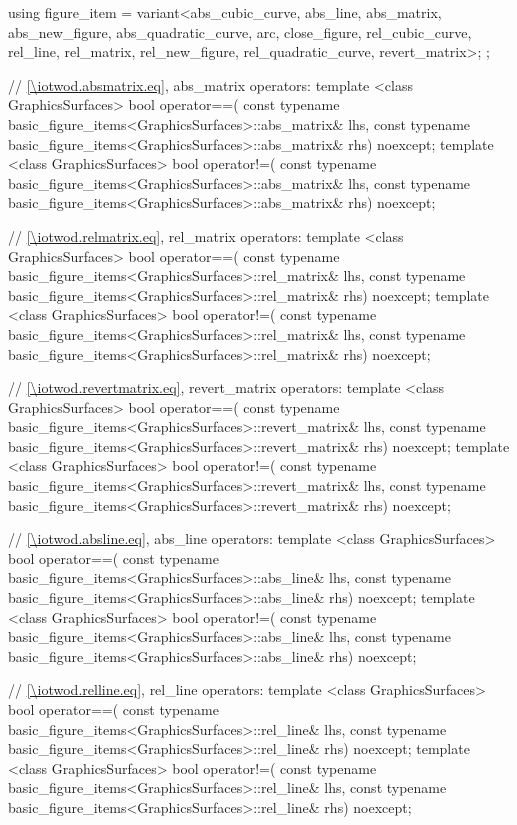\begin{codeblock}
{{    using figure_item = variant<abs_cubic_curve, abs_line, abs_matrix, abs_new_figure,
      abs_quadratic_curve, arc, close_figure, rel_cubic_curve, rel_line, rel_matrix,
      rel_new_figure, rel_quadratic_curve, revert_matrix>;
  };

  // \ref{\iotwod.absmatrix.eq}, abs_matrix operators:
  template <class GraphicsSurfaces>
  bool operator==(
    const typename basic_figure_items<GraphicsSurfaces>::abs_matrix& lhs,
    const typename basic_figure_items<GraphicsSurfaces>::abs_matrix& rhs) 
    noexcept;
  template <class GraphicsSurfaces>
  bool operator!=(
    const typename basic_figure_items<GraphicsSurfaces>::abs_matrix& lhs,
    const typename basic_figure_items<GraphicsSurfaces>::abs_matrix& rhs) 
    noexcept;

  // \ref{\iotwod.relmatrix.eq}, rel_matrix operators:
  template <class GraphicsSurfaces>
  bool operator==(
    const typename basic_figure_items<GraphicsSurfaces>::rel_matrix& lhs,
    const typename basic_figure_items<GraphicsSurfaces>::rel_matrix& rhs) 
    noexcept;
  template <class GraphicsSurfaces>
  bool operator!=(
    const typename basic_figure_items<GraphicsSurfaces>::rel_matrix& lhs,
    const typename basic_figure_items<GraphicsSurfaces>::rel_matrix& rhs) 
    noexcept;

  // \ref{\iotwod.revertmatrix.eq}, revert_matrix operators:
  template <class GraphicsSurfaces>
  bool operator==(
    const typename basic_figure_items<GraphicsSurfaces>::revert_matrix& lhs,
    const typename basic_figure_items<GraphicsSurfaces>::revert_matrix& rhs) 
    noexcept;
  template <class GraphicsSurfaces>
  bool operator!=(
    const typename basic_figure_items<GraphicsSurfaces>::revert_matrix& lhs,
    const typename basic_figure_items<GraphicsSurfaces>::revert_matrix& rhs) 
    noexcept;

  // \ref{\iotwod.absline.eq}, abs_line operators:
  template <class GraphicsSurfaces>
  bool operator==(
    const typename basic_figure_items<GraphicsSurfaces>::abs_line& lhs,
    const typename basic_figure_items<GraphicsSurfaces>::abs_line& rhs) 
    noexcept;
  template <class GraphicsSurfaces>
  bool operator!=(
    const typename basic_figure_items<GraphicsSurfaces>::abs_line& lhs,
    const typename basic_figure_items<GraphicsSurfaces>::abs_line& rhs) 
    noexcept;

  // \ref{\iotwod.relline.eq}, rel_line operators:
  template <class GraphicsSurfaces>
  bool operator==(
    const typename basic_figure_items<GraphicsSurfaces>::rel_line& lhs,
    const typename basic_figure_items<GraphicsSurfaces>::rel_line& rhs) 
    noexcept;
  template <class GraphicsSurfaces>
  bool operator!=(
    const typename basic_figure_items<GraphicsSurfaces>::rel_line& lhs,
    const typename basic_figure_items<GraphicsSurfaces>::rel_line& rhs) 
    noexcept;

}
\end{codeblock}
